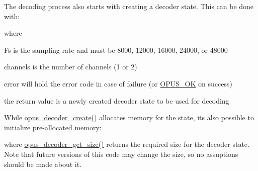 The decoding process also starts with creating a decoder state. This can be done with\+: 
\begin{DoxyCode}{0}
\end{DoxyCode}
 where \begin{DoxyItemize}
\item Fs is the sampling rate and must be 8000, 12000, 16000, 24000, or 48000 \item channels is the number of channels (1 or 2) \item error will hold the error code in case of failure (or \mbox{\hyperlink{group__opus__errorcodes_gaa44cf8a185e1b5cb940ef63eb4f02d21}{O\+P\+U\+S\+\_\+\+OK}} on success) \item the return value is a newly created decoder state to be used for decoding\end{DoxyItemize}
While \mbox{\hyperlink{group__opus__decoder_ga6a06f16309dee5883c27223d127c4300}{opus\+\_\+decoder\+\_\+create()}} allocates memory for the state, it\textquotesingle{}s also possible to initialize pre-\/allocated memory\+: 
\begin{DoxyCode}{0}
\end{DoxyCode}
 where \mbox{\hyperlink{group__opus__decoder_gaee52cd75f7160fda7a0916d72363940b}{opus\+\_\+decoder\+\_\+get\+\_\+size()}} returns the required size for the decoder state. Note that future versions of this code may change the size, so no assuptions should be made about it.

